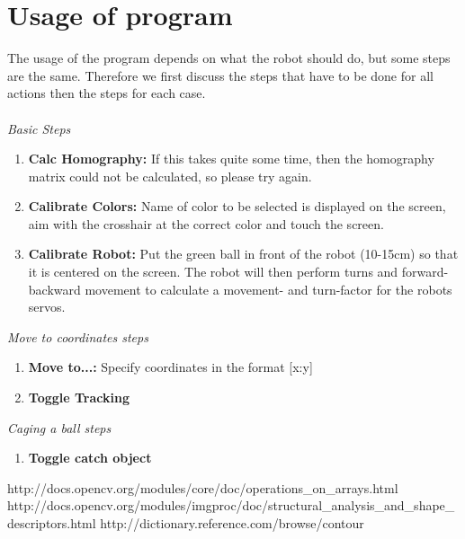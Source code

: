\documentclass[703031]{iisreport}
\begin{document}
\section{Usage of program}
The usage of the program depends on what the robot should do, but some steps are the same. Therefore we first discuss the steps that have to be done for all actions then the steps for each case.\\\\
\emph{Basic Steps}
	\begin{enumerate}
		\item \textbf{Calc Homography:} If this takes quite some time, then the homography matrix could not be calculated, so please try again.
		\item \textbf{Calibrate Colors:} Name of color to be selected is displayed on the screen, aim with the crosshair at the correct color and touch the screen.
		\item \textbf{Calibrate Robot:} Put the green ball in front of the robot (10-15cm) so that it is centered on the screen. The robot will then perform turns and forward-backward movement to calculate a movement- and turn-factor for the robots servos.\\
	\end{enumerate}
\emph{Move to coordinates steps}
	\begin{enumerate}
		\item \textbf{Move to...:} Specify coordinates in the format [x:y]
		\item \textbf{Toggle Tracking}\\
	\end{enumerate}
\emph{Caging a ball steps}
	\begin{enumerate}
		\item \textbf{Toggle catch object}
	\end{enumerate}


\small
\begin{thebibliography}{9}
		http://docs.opencv.org/modules/core/doc/operations\_on\_arrays.html	
		http://docs.opencv.org/modules/imgproc/doc/structural\_analysis\_and\_shape\_descriptors.html
		http://dictionary.reference.com/browse/contour
\end{thebibliography}
\end{document}

